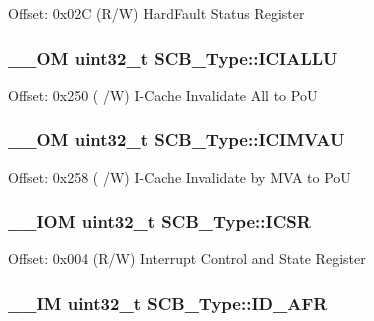 Offset\-: 0x02\-C (R/\-W) Hard\-Fault Status Register \hypertarget{struct_s_c_b___type_a573260e7836dbc43707df97dd475a0c8}{
\subsubsection[{I\-C\-I\-A\-L\-L\-U}]{\setlength{\rightskip}{0pt plus 5cm}\-\_\-\-\_\-\-O\-M uint32\-\_\-t S\-C\-B\-\_\-\-Type\-::\-I\-C\-I\-A\-L\-L\-U}}\label{struct_s_c_b___type_a573260e7836dbc43707df97dd475a0c8}
Offset\-: 0x250 ( /\-W) I-\/\-Cache Invalidate All to Po\-U \hypertarget{struct_s_c_b___type_a5eca5a3e5aedd89a9655df8f5798e2b0}{
\subsubsection[{I\-C\-I\-M\-V\-A\-U}]{\setlength{\rightskip}{0pt plus 5cm}\-\_\-\-\_\-\-O\-M uint32\-\_\-t S\-C\-B\-\_\-\-Type\-::\-I\-C\-I\-M\-V\-A\-U}}\label{struct_s_c_b___type_a5eca5a3e5aedd89a9655df8f5798e2b0}
Offset\-: 0x258 ( /\-W) I-\/\-Cache Invalidate by M\-V\-A to Po\-U \hypertarget{struct_s_c_b___type_a0ca18ef984d132c6bf4d9b61cd00f05a}{
\subsubsection[{I\-C\-S\-R}]{\setlength{\rightskip}{0pt plus 5cm}\-\_\-\-\_\-\-I\-O\-M uint32\-\_\-t S\-C\-B\-\_\-\-Type\-::\-I\-C\-S\-R}}\label{struct_s_c_b___type_a0ca18ef984d132c6bf4d9b61cd00f05a}
Offset\-: 0x004 (R/\-W) Interrupt Control and State Register \hypertarget{struct_s_c_b___type_a9c9a1d805f8e99b9fd3ab4f455b6333a}{
\subsubsection[{I\-D\-\_\-\-A\-F\-R}]{\setlength{\rightskip}{0pt plus 5cm}\-\_\-\-\_\-\-I\-M uint32\-\_\-t S\-C\-B\-\_\-\-Type\-::\-I\-D\-\_\-\-A\-F\-R}}\label{struct_s_c_b___type_a9c9a1d805f8e99b9fd3ab4f455b6333a}

